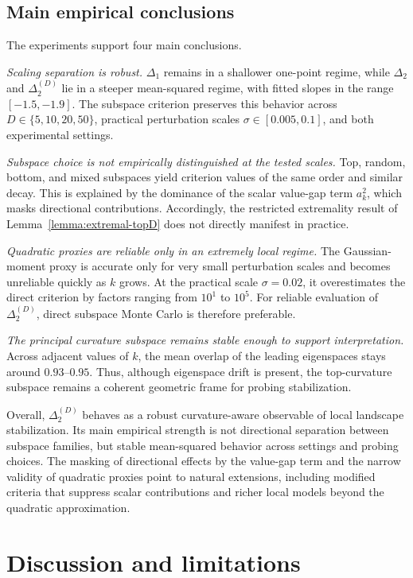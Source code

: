 \documentclass[10pt]{article}
\theoremstyle{plain}
\theoremstyle{remark}
\begin{document}
\subsection{Main empirical conclusions}
\label{sec:exp-summary}

The experiments support four main conclusions.

\emph{Scaling separation is robust.}
$\Delta_1$ remains in a shallower one-point regime, while $\Delta_2$ and $\Delta_2^{(D)}$ lie in a steeper mean-squared regime, with fitted slopes in the range $[-1.5,-1.9]$.
The subspace criterion preserves this behavior across $D\in\{5,10,20,50\}$, practical perturbation scales $\sigma\in[0.005,0.1]$, and both experimental settings.

\emph{Subspace choice is not empirically distinguished at the tested scales.}
Top, random, bottom, and mixed subspaces yield criterion values of the same order and similar decay.
This is explained by the dominance of the scalar value-gap term $a_k^2$, which masks directional contributions.
Accordingly, the restricted extremality result of Lemma~\ref{lemma:extremal-topD} does not directly manifest in practice.

\emph{Quadratic proxies are reliable only in an extremely local regime.}
The Gaussian-moment proxy is accurate only for very small perturbation scales and becomes unreliable quickly as $k$ grows.
At the practical scale $\sigma=0.02$, it overestimates the direct criterion by factors ranging from $10^1$ to $10^5$.
For reliable evaluation of $\Delta_2^{(D)}$, direct subspace Monte Carlo is therefore preferable.

\emph{The principal curvature subspace remains stable enough to support interpretation.}
Across adjacent values of $k$, the mean overlap of the leading eigenspaces stays around $0.93$--$0.95$.
Thus, although eigenspace drift is present, the top-curvature subspace remains a coherent geometric frame for probing stabilization.

Overall, $\Delta_2^{(D)}$ behaves as a robust curvature-aware observable of local landscape stabilization.
Its main empirical strength is not directional separation between subspace families, but stable mean-squared behavior across settings and probing choices.
The masking of directional effects by the value-gap term and the narrow validity of quadratic proxies point to natural extensions, including modified criteria that suppress scalar contributions and richer local models beyond the quadratic approximation.

\section{Discussion and limitations}
\label{sec:discussion}
\end{document}
